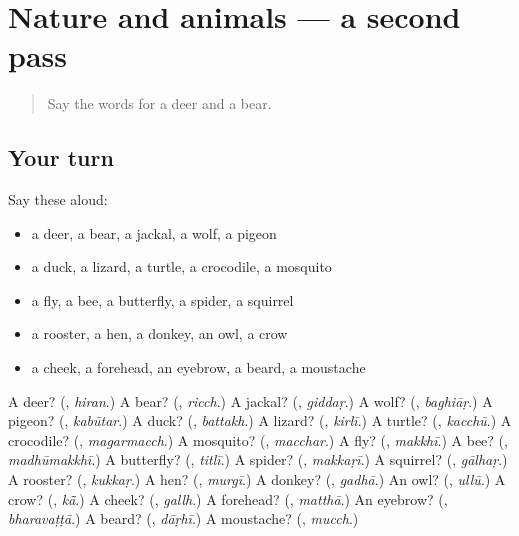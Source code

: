 \section[(dialogue)]{Nature and animals — a second pass}

\label{lesson:PA-R134-second-pass-nature-and-animals}



\begin{quote}
Say the words for a deer and a bear.
\end{quote}

\subsection*{Your turn}
Say these aloud:

\begin{itemize}
\raggedright
  \item a deer, a bear, a jackal, a wolf, a pigeon
  \item a duck, a lizard, a turtle, a crocodile, a mosquito
  \item a fly, a bee, a butterfly, a spider, a squirrel
  \item a rooster, a hen, a donkey, an owl, a crow
  \item a cheek, a forehead, an eyebrow, a beard, a moustache
\end{itemize}

\begin{tcolorbox}[breakable,colback=teal!4,colframe=teal!35!black,title={Before you move on}]
A deer? (\textbf{}, \emph{hiran}.) A bear? (\textbf{}, \emph{ricch}.) A jackal? (\textbf{}, \emph{giddaṛ}.) A wolf? (\textbf{}, \emph{baghiāṛ}.) A pigeon? (\textbf{}, \emph{kabūtar}.) A duck? (\textbf{}, \emph{battakh}.) A lizard? (\textbf{}, \emph{kirlī}.) A turtle? (\textbf{}, \emph{kacchū}.) A crocodile? (\textbf{}, \emph{magarmacch}.) A mosquito? (\textbf{}, \emph{macchar}.) A fly? (\textbf{}, \emph{makkhī}.) A bee? (\textbf{}, \emph{madhūmakkhī}.) A butterfly? (\textbf{}, \emph{titlī}.) A spider? (\textbf{}, \emph{makkaṛī}.) A squirrel? (\textbf{}, \emph{gālhaṛ}.) A rooster? (\textbf{}, \emph{kukkaṛ}.) A hen? (\textbf{}, \emph{murgī}.) A donkey? (\textbf{}, \emph{gadhā}.) An owl? (\textbf{}, \emph{ullū}.) A crow? (\textbf{}, \emph{kā̃}.) A cheek? (\textbf{}, \emph{gallh}.) A forehead? (\textbf{}, \emph{matthā}.) An eyebrow? (\textbf{}, \emph{bharavaṭṭā}.) A beard? (\textbf{}, \emph{dāṛhī}.) A moustache? (\textbf{}, \emph{mucch}.)
\end{tcolorbox}
